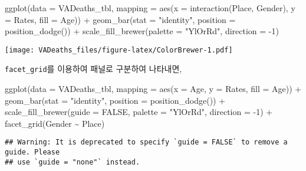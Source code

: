 \documentclass[
]{article}
\newenvironment{Shaded}{\begin{snugshade}}{\end{snugshade}}
\newcommand{\AttributeTok}[1]{\textcolor[rgb]{0.77,0.63,0.00}{#1}}
\newcommand{\ConstantTok}[1]{\textcolor[rgb]{0.00,0.00,0.00}{#1}}
\newcommand{\DecValTok}[1]{\textcolor[rgb]{0.00,0.00,0.81}{#1}}
\newcommand{\FunctionTok}[1]{\textcolor[rgb]{0.00,0.00,0.00}{#1}}
\newcommand{\NormalTok}[1]{#1}
\newcommand{\SpecialCharTok}[1]{\textcolor[rgb]{0.00,0.00,0.00}{#1}}
\newcommand{\StringTok}[1]{\textcolor[rgb]{0.31,0.60,0.02}{#1}}
\begin{document}
\begin{Shaded}
\begin{Highlighting}[]
\FunctionTok{ggplot}\NormalTok{(}\AttributeTok{data =}\NormalTok{ VADeaths\_tbl,}
              \AttributeTok{mapping =} \FunctionTok{aes}\NormalTok{(}\AttributeTok{x =} \FunctionTok{interaction}\NormalTok{(Place, Gender), }
                            \AttributeTok{y =}\NormalTok{ Rates, }
                            \AttributeTok{fill =}\NormalTok{ Age)) }\SpecialCharTok{+}
\FunctionTok{geom\_bar}\NormalTok{(}\AttributeTok{stat =} \StringTok{"identity"}\NormalTok{, }
         \AttributeTok{position =} \FunctionTok{position\_dodge}\NormalTok{()) }\SpecialCharTok{+}
\FunctionTok{scale\_fill\_brewer}\NormalTok{(}\AttributeTok{palette =} \StringTok{"YlOrRd"}\NormalTok{, }
                  \AttributeTok{direction =} \SpecialCharTok{{-}}\DecValTok{1}\NormalTok{)}
\end{Highlighting}
\end{Shaded}

\texttt{[image: VADeaths\_files/figure-latex/ColorBrewer-1.pdf]}

\texttt{facet\_grid}를 이용하여 패널로 구분하여 나타내면,

\begin{Shaded}
\begin{Highlighting}[]
\FunctionTok{ggplot}\NormalTok{(}\AttributeTok{data =}\NormalTok{ VADeaths\_tbl,}
              \AttributeTok{mapping =} \FunctionTok{aes}\NormalTok{(}\AttributeTok{x =}\NormalTok{ Age, }
                            \AttributeTok{y =}\NormalTok{ Rates, }
                            \AttributeTok{fill =}\NormalTok{ Age)) }\SpecialCharTok{+}
\FunctionTok{geom\_bar}\NormalTok{(}\AttributeTok{stat =} \StringTok{"identity"}\NormalTok{, }
         \AttributeTok{position =} \FunctionTok{position\_dodge}\NormalTok{()) }\SpecialCharTok{+} 
\FunctionTok{scale\_fill\_brewer}\NormalTok{(}\AttributeTok{guide =} \ConstantTok{FALSE}\NormalTok{,}
                  \AttributeTok{palette =} \StringTok{"YlOrRd"}\NormalTok{, }
                  \AttributeTok{direction =} \SpecialCharTok{{-}}\DecValTok{1}\NormalTok{) }\SpecialCharTok{+}
\FunctionTok{facet\_grid}\NormalTok{(Gender }\SpecialCharTok{\textasciitilde{}}\NormalTok{ Place)}
\end{Highlighting}
\end{Shaded}

\begin{verbatim}
## Warning: It is deprecated to specify `guide = FALSE` to remove a guide. Please
## use `guide = "none"` instead.
\end{verbatim}
\end{document}
